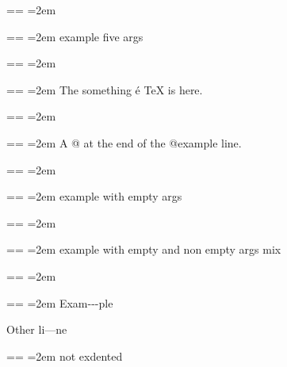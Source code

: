 \documentclass{book}
\makeatletter
\newenvironment{GNUTexinfopreformatted}{%
  \par\obeylines\obeyspaces\frenchspacing
  \parskip=\z@\parindent=\z@}{}
\makeatother
\begin{document}
\begin{GNUTexinfopreformatted}
\leftskip=2em\relax\ttfamily%

\end{GNUTexinfopreformatted}
\begin{GNUTexinfopreformatted}
\leftskip=2em\relax\ttfamily%
example five args
\end{GNUTexinfopreformatted}
\begin{GNUTexinfopreformatted}
\leftskip=2em\relax\ttfamily%

\end{GNUTexinfopreformatted}
\begin{GNUTexinfopreformatted}
\leftskip=2em\relax\ttfamily%
The something \'{e} \TeX{} is here.
\end{GNUTexinfopreformatted}
\begin{GNUTexinfopreformatted}
\leftskip=2em\relax\ttfamily%

\end{GNUTexinfopreformatted}
\begin{GNUTexinfopreformatted}
\leftskip=2em\relax\ttfamily%
A @ at the end of the @example line.
\end{GNUTexinfopreformatted}
\begin{GNUTexinfopreformatted}
\leftskip=2em\relax\ttfamily%

\end{GNUTexinfopreformatted}
\begin{GNUTexinfopreformatted}
\leftskip=2em\relax\ttfamily%
example with empty args
\end{GNUTexinfopreformatted}
\begin{GNUTexinfopreformatted}
\leftskip=2em\relax\ttfamily%

\end{GNUTexinfopreformatted}
\begin{GNUTexinfopreformatted}
\leftskip=2em\relax\ttfamily%
example with empty and non empty args mix
\end{GNUTexinfopreformatted}
\begin{GNUTexinfopreformatted}
\leftskip=2em\relax\ttfamily%

\end{GNUTexinfopreformatted}
\begin{GNUTexinfopreformatted}
\leftskip=2em\relax\ttfamily%
Exam{-}{-}{-}ple

\end{GNUTexinfopreformatted}
\noindent Other li---ne
\begin{GNUTexinfopreformatted}
\leftskip=2em\relax\ttfamily%
not exdented
\end{GNUTexinfopreformatted}
\end{document}
